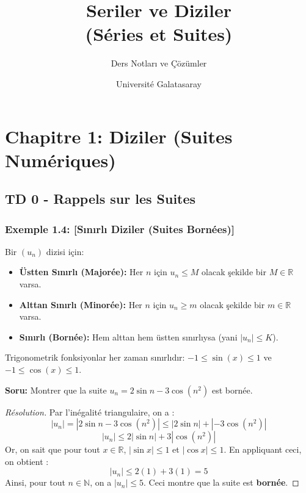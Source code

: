 \documentclass[12pt,a4paper]{report}
\title{\textbf{Seriler ve Diziler\\ (Séries et Suites)}}
\author{Ders Notları ve Çözümler}
\date{Université Galatasaray}
\begin{document}
\shorthandoff{=}
\maketitle
\tableofcontents

\chapter{Chapitre 1: Diziler (Suites Numériques)}

\section{TD 0 - Rappels sur les Suites}

\subsection*{Exemple 1.4: [Sınırlı Diziler (Suites Bornées)]}

\begin{tcolorbox}[colback=blue!5!white,colframe=blue!75!black,title=Hatırlatma (Rappel): Sınırlı Diziler]
Bir $(u_n)$ dizisi için:
\begin{itemize}
    \item \textbf{Üstten Sınırlı (Majorée):} Her $n$ için $u_n \le M$ olacak şekilde bir $M \in \mathbb{R}$ varsa.
    \item \textbf{Alttan Sınırlı (Minorée):} Her $n$ için $u_n \ge m$ olacak şekilde bir $m \in \mathbb{R}$ varsa.
    \item \textbf{Sınırlı (Bornée):} Hem alttan hem üstten sınırlıysa (yani $|u_n| \le K$).
\end{itemize}
Trigonometrik fonksiyonlar her zaman sınırlıdır: $-1 \le \sin(x) \le 1$ ve $-1 \le \cos(x) \le 1$.
\end{tcolorbox}

\textbf{Soru:}
Montrer que la suite $u_n = 2 \sin n - 3 \cos(n^2)$ est bornée.

\begin{proof}[Résolution]
Par l'inégalité triangulaire, on a :
\[ |u_n| = |2 \sin n - 3 \cos(n^2)| \le |2 \sin n| + |-3 \cos(n^2)| \]
\[ |u_n| \le 2 |\sin n| + 3 |\cos(n^2)| \]
Or, on sait que pour tout $x \in \mathbb{R}$, $|\sin x| \le 1$ et $|\cos x| \le 1$. En appliquant ceci, on obtient :
\[ |u_n| \le 2(1) + 3(1) = 5 \]
Ainsi, pour tout $n \in \mathbb{N}$, on a $|u_n| \le 5$. Ceci montre que la suite est \textbf{bornée}.
\end{proof}
\end{document}
